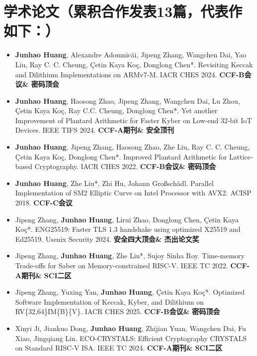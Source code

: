 \documentclass[UTF8,AutoFakeBold]{resume}
\begin{document}
\section{\hspace{0.25em}\makebox[0.75em][c]{\faFlask} \fangsong\textbf{学术论文（累积合作发表13篇，代表作如下：）}}
\begin{itemize}
    \item {\textbf{Junhao Huang}, Alexandre Adomnicăi, Jipeng Zhang, Wangchen Dai, Yao Liu, Ray C. C. Cheung, \c{C}etin Kaya Ko\c{c}, Donglong Chen*. Revisiting Keccak and Dilithium Implementations on ARMv7-M. IACR CHES 2024. \textbf{CCF-B会议\& 密码顶会}}
    \item {\textbf{Junhao Huang}, Haosong Zhao, Jipeng Zhang, Wangchen Dai, Lu Zhou, \c{C}etin Kaya Ko\c{c}, Ray C.C. Cheung, Donglong Chen*. Yet another Improvement of Plantard Arithmetic for Faster Kyber on Low-end 32-bit IoT Devices. IEEE TIFS 2024. \textbf{CCF-A期刊\& 安全顶刊}}
    \item {\textbf{Junhao Huang}, Jipeng Zhang, Haosong Zhao, Zhe Liu, Ray C. C. Cheung, \c{C}etin Kaya Ko\c{c}, Donglong Chen*. Improved Plantard Arithmetic for Lattice-based Cryptography. IACR CHES 2022. \textbf{CCF-B会议\& 密码顶会}}
    \item {\textbf{Junhao Huang}, Zhe Liu*, Zhi Hu, Johann Großschädl. Parallel Implementation of SM2 Elliptic Curve on Intel Processor with AVX2. ACISP 2018. \textbf{CCF-C会议}}
    \item {Jipeng Zhang, \textbf{Junhao Huang}, Lirui Zhao, Donglong Chen, Çetin Kaya Koç*. ENG25519: Faster TLS 1.3 handshake using optimized X25519 and Ed25519. Usenix Security 2024. \textbf{安全四大顶会\& 杰出论文奖}}
    \item {Jipeng Zhang, \textbf{Junhao Huang}, Zhe Liu*, Sujoy Sinha Roy. Time-memory Trade-offs for Saber on Memory-constrained RISC-V. IEEE TC 2022. \textbf{CCF-A期刊\& SCI二区}}
    \item {Jipeng Zhang, Yuxing Yan, \textbf{Junhao Huang}, Çetin Kaya Koç*. Optimized Software Implementation of Keccak, Kyber, and Dilithium on RV\{32,64\}IM\{B\}\{V\}. IACR CHES 2025. \textbf{CCF-B会议\& 密码顶会}}
    \item {Xinyi Ji, Jiankuo Dong, \textbf{Junhao Huang}, Zhijian Yuan, Wangchen Dai, Fu Xiao, Jingqiang Lin. ECO-CRYSTALS: Efficient Cryptography CRYSTALS on Standard RISC-V ISA. IEEE TC 2024. \textbf{CCF-A期刊\& SCI二区}}
\end{itemize}

\vspace{2mm}
\end{document}
